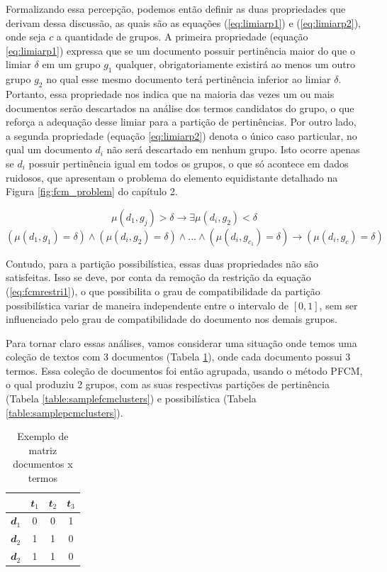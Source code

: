 Formalizando essa
percepção, podemos então definir as duas propriedades  que derivam dessa discussão, as quais são as
equações (\ref{eq:limiarp1}) e (\ref{eq:limiarp2}), onde seja $c$ a quantidade de grupos. A primeira
propriedade (equação \ref{eq:limiarp1}) expressa que se um documento possuir pertinência maior do
que o limiar $\delta$ em um grupo $g_1$ qualquer, obrigatoriamente existirá ao menos um outro grupo
$g_2$ no qual esse mesmo documento terá pertinência inferior ao limiar $\delta$. Portanto, essa
propriedade nos indica que na maioria das vezes um ou mais documentos serão descartados na análise
dos termos candidatos do grupo, o que reforça a adequação desse limiar para a partição de
pertinências. Por outro lado, a segunda
propriedade (equação \ref{eq:limiarp2}) denota o único caso particular, no qual um documento $d_i$
não será descartado em nenhum grupo. Isto ocorre apenas se $d_i$ possuir pertinência igual em todos
os grupos, o que só acontece em dados ruidosos, que apresentam o problema do elemento equidistante
detalhado na Figura \ref{fig:fcm_problem} do capítulo 2.

\begin{equation}
  \mu(d_1,g_j) > \delta \rightarrow \exists \mu(d_i, g_2) < \delta
  \label{eq:limiarp1}
\end{equation}
\begin{equation}
  ( \mu(d_1,g_1) = \delta ) \wedge ( \mu(d_i,g_2) = \delta ) \wedge ... \wedge ( \mu(d_i,g_{c_1}) =
  \delta ) \rightarrow ( \mu(d_i, g_c) = \delta  )
  \label{eq:limiarp2}
\end{equation}

Contudo, para a partição possibilística, essas duas propriedades não são satisfeitas. Isso se deve,
por conta da remoção da restrição da equação (\ref{eq:fcmrestri1}), o que possibilita 
o grau de compatibilidade da partição possibilística variar de maneira independente entre o intervalo
de $[0,1]$, sem ser influenciado pelo grau de compatibilidade do documento nos demais grupos.

Para tornar claro essas análises, vamos considerar uma situação onde temos uma coleção de textos com
3 documentos (Tabela \ref{table:sampledocuments}), onde cada documento possui 3 termos. Essa coleção
de documentos foi então agrupada, usando o método PFCM, o qual produziu 2 grupos, com as suas
respectivas partições de pertinência (Tabela
\ref{table:samplefcmclusters}) e possibilística (Tabela \ref{table:samplepcmclusters}).

\begin{table}[!htp]
  \centering
  \begin{tabular}{ |c|c|c|c|}
    \hline
    & $\mathbfit{t_1}$ & $\mathbfit{t_2}$ & $\mathbfit{t_3}$ \\
    \hline
    $\mathbfit{d_1}$ & 0 & 0 & 1 \\
    \hline
    $\mathbfit{d_2}$ & 1 & 1 & 0 \\
    \hline
    $\mathbfit{d_2}$ & 1 & 1 & 0 \\
    \hline
  \end{tabular}
  \caption{Exemplo de matriz documentos x termos}
  \label{table:sampledocuments}
\end{table}

